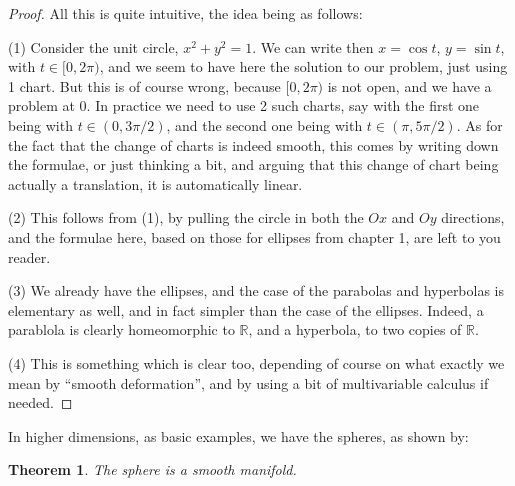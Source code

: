 \documentclass[12pt]{amsbook}
\newtheorem{theorem}{Theorem}[chapter]
\begin{document}
\begin{proof}
All this is quite intuitive, the idea being as follows:

\medskip

(1) Consider the unit circle, $x^2+y^2=1$. We can write then $x=\cos t$, $y=\sin t$, with $t\in[0,2\pi)$, and we seem to have here the solution to our problem, just using 1 chart. But this is of course wrong, because $[0,2\pi)$ is not open, and we have a problem at $0$. In practice we need to use 2 such charts, say with the first one being with $t\in(0,3\pi/2)$, and the second one being with $t\in(\pi,5\pi/2)$. As for the fact that the change of charts is indeed smooth, this comes by writing down the formulae, or just thinking a bit, and arguing that this change of chart being actually a translation, it is automatically linear.

\medskip

(2) This follows from (1), by pulling the circle in both the $Ox$ and $Oy$ directions, and the  formulae here, based on those for ellipses from chapter 1, are left to you reader.

\medskip

(3) We already have the ellipses, and the case of the parabolas and hyperbolas is elementary as well, and in fact simpler than the case of the ellipses. Indeed, a parablola is clearly homeomorphic to $\mathbb R$, and a hyperbola, to two copies of $\mathbb R$.

\medskip

(4) This is something which is clear too, depending of course on what exactly we mean by ``smooth deformation'', and by using a bit of multivariable calculus if needed.
\end{proof}

In higher dimensions, as basic examples, we have the spheres, as shown by:

\begin{theorem}
The sphere is a smooth manifold.
\end{theorem}
\end{document}
